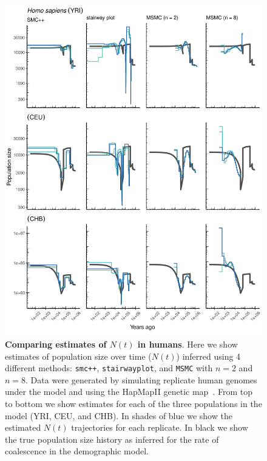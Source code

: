 \documentclass[12pt,halfline,a4paper]{ouparticle}
\newcommand{\MSMC}{\texttt{MSMC}\xspace}
\newcommand{\smcpp}{\texttt{smc++}\xspace}
\begin{document}
\begin{figure}
\begin{center}
\includegraphics[width=0.8\linewidth]{display_items/homo_sapiens_mask_Ragsdale.png}
\caption{\textbf{Comparing estimates of $N(t)$ in humans}. Here we show estimates of population
size over time ($N(t)$) inferred using 4 different methods: \smcpp, \texttt{stairwayplot}, and
\MSMC with $n=2$ and $n=8$. Data were generated by simulating
replicate human genomes under the \cite{ragsdale2019models} model and using the
HapMapII genetic map~\citep{international2007second}. From top to bottom we show estimates for each
of the three populations in the model (YRI, CEU, and CHB). In shades of blue we show the estimated
$N(t)$ trajectories for each replicate. In black we show the true population size history as inferred
for the rate of coalescence in the demographic model.}
\label{fig:n_t_ragsdale}
\end{center}
\end{figure}
\end{document}
